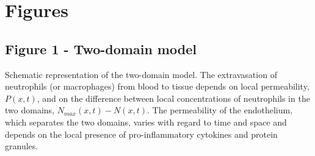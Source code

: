 \documentclass[10pt]{bmc_article}
\newenvironment{bmcformat}{\baselineskip20pt\sloppy\setboolean{publ}{false}}{\baselineskip20pt\sloppy}
\begin{document}
\begin{bmcformat}

\newpage
{
   }     %





\section*{Figures}

\subsection*{Figure 1 - Two-domain model}
Schematic representation of the two-domain model. The extravasation of neutrophils (or macrophages) from blood 
to tissue depends on local permeability, $P(x,t)$, and on the difference between local concentrations of neutrophils in the two domains, 
$N_{max}(x,t) - N(x,t)$. The permeability of the endothelium, which separates the two domains, varies with regard to time and space and depends 
on the local presence of pro-inflammatory cytokines and protein granules.


\end{bmcformat}
\end{document}
